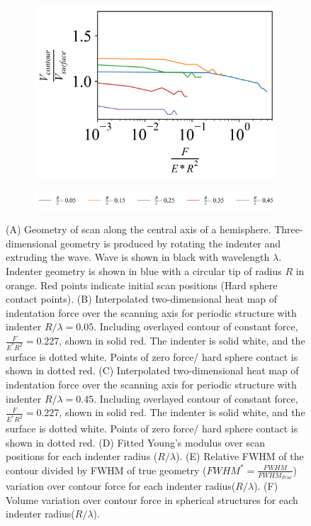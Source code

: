 \begin{figure}[H]
\begin{subfigure}[t]{0.325\textwidth}
        \includegraphics[width=1\linewidth]{Figures/Wave-Volume.png}
    \end{subfigure}

     \hfill
     
    \begin{subfigure}[t]{1\textwidth}
        \centering
        \includegraphics[width=1\linewidth]{Figures/Wave-Legend.png}
    \end{subfigure}

    \caption{\label{fig: Wave Compression Plot}(A) Geometry of scan along the central axis of a hemisphere. Three-dimensional geometry is produced by rotating the indenter and extruding the wave. Wave is shown in black with wavelength $\lambda$. Indenter geometry is shown in blue with a circular tip of radius $R$ in orange. Red points indicate initial scan positions (Hard sphere contact points). (B) Interpolated two-dimensional heat map of indentation force over the scanning axis for periodic structure with indenter $R/\lambda=0.05$. Including overlayed contour of constant force, $\frac{F}{E^*R^2} = 0.227 $, shown in solid red. The indenter is solid white, and the surface is dotted white. Points of zero force/ hard sphere contact is shown in dotted red. (C) Interpolated two-dimensional heat map of indentation force over the scanning axis for periodic structure with indenter $R/\lambda=0.45$. Including overlayed contour of constant force, $\frac{F}{E^*R^2} = 0.227 $, shown in solid red. The indenter is solid white, and the surface is dotted white. Points of zero force/ hard sphere contact is shown in dotted red. (D) Fitted Young's modulus over scan positions for each indenter radius ($R/\lambda$). (E) Relative FWHM of the contour divided by FWHM of true geometry ($FWHM^*=\frac{FWHM}{FWHM_{True}}$) variation over contour force for each indenter radius($R/\lambda$). (F)  Volume variation over contour force in spherical structures for each indenter radius($R/\lambda$).}
    
\end{figure}


